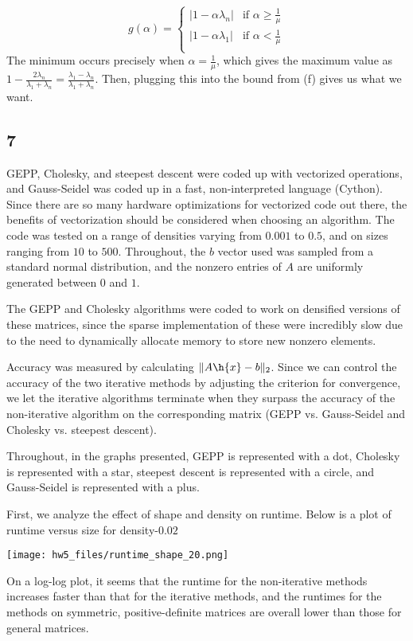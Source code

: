 \documentclass{article}
\begin{document}
\[
    g(\alpha)=\begin{cases}
        |1-\alpha\lambda_n|&\text{if }\alpha\geq\frac{1}{\mu}\\
        |1-\alpha\lambda_1|&\text{if }\alpha<\frac{1}{\mu}\\
    \end{cases}
\]
The minimum occurs precisely when $\alpha=\frac{1}{\mu}$, which gives the maximum value as $1-\frac{2\lambda_n}{\lambda_1+\lambda_n}=\frac{\lambda_1-\lambda_n}{\lambda_1+\lambda_n}$. Then, plugging this into the bound from (f) gives us what we want.
\subsection*{7}
GEPP, Cholesky, and steepest descent were coded up with vectorized operations, and Gauss-Seidel was coded up in a fast, non-interpreted language (Cython). Since there are so many hardware optimizations for vectorized code out there, the benefits of vectorization should be considered when choosing an algorithm. The code was tested on a range of densities varying from $0.001$ to $0.5$, and on sizes ranging from $10$ to $500$. Throughout, the $b$ vector used was sampled from a standard normal distribution, and the nonzero entries of $A$ are uniformly generated between $0$ and $1$. 

The GEPP and Cholesky algorithms were coded to work on densified versions of these matrices, since the sparse implementation of these were incredibly slow due to the need to dynamically allocate memory to store new nonzero elements.

Accuracy was measured by calculating $\|A\h{x}-b\|_2$. Since we can control the accuracy of the two iterative methods by adjusting the criterion for convergence, we let the iterative algorithms terminate when they surpass the accuracy of the non-iterative algorithm on the corresponding matrix (GEPP vs. Gauss-Seidel and Cholesky vs. steepest descent). 

Throughout, in the graphs presented, GEPP is represented with a dot, Cholesky is represented with a star, steepest descent is represented with a circle, and Gauss-Seidel is represented with a plus.

First, we analyze the effect of shape and density on runtime. Below is a plot of runtime versus size for density-$0.02$

\texttt{[image: hw5\_files/runtime\_shape\_20.png]}

On a log-log plot, it seems that the runtime for the non-iterative methods increases faster than that for the iterative methods, and the runtimes for the methods on symmetric, positive-definite matrices are overall lower than those for general matrices.
\end{document}

